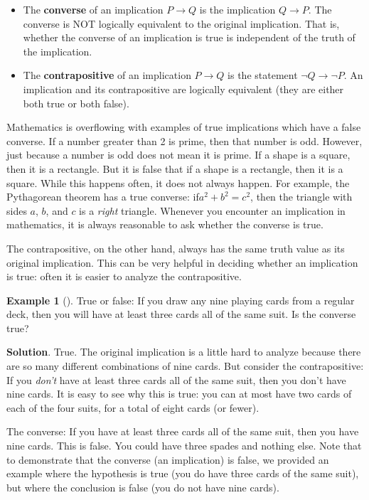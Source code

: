 \documentclass[10pt,]{book}
\newcommand{\terminology}[1]{\textbf{#1}}
\theoremstyle{plain}
\theoremstyle{definition}
\theoremstyle{definition}
\newtheorem{example}[theorem]{Example}
\theoremstyle{definition}
\theoremstyle{definition}
\numberwithin{equation}{chapter}
\def\imp{\rightarrow}
\begin{document}
\begin{assemblage}\label{assemblage-19}
\hypertarget{p-1405}{}%
%
\begin{itemize}[label=\textbullet]
\item{}\hypertarget{p-1406}{}%
The \terminology{converse}  of an implication \(P \imp Q\) is the implication \(Q \imp P\). The converse is NOT logically equivalent to the original implication.  That is, whether the converse of an implication is true is independent of the truth of the implication.%
\item{}\hypertarget{p-1407}{}%
The \terminology{contrapositive}  of an implication \(P \imp Q\) is the statement \(\neg Q \imp \neg P\). An implication and its contrapositive are logically equivalent (they are either both true or both false).%
\end{itemize}
%
\end{assemblage}
\hypertarget{p-1408}{}%
Mathematics is overflowing with examples of true implications which have a false converse. If a number greater than 2 is prime, then that number is odd. However, just because a number is odd does not mean it is prime. If a shape is a square, then it is a rectangle. But it is false that if a shape is a rectangle, then it is a square. While this happens often, it does not always happen. For example, the Pythagorean theorem has a true converse: if\(a^2 + b^2 = c^2\), then the triangle with sides \(a\), \(b\), and \(c\) is a \emph{right} triangle. Whenever you encounter an implication in mathematics, it is always reasonable to ask whether the converse is true.%
\par
\hypertarget{p-1409}{}%
The contrapositive, on the other hand, always has the same truth value as its original implication. This can be very helpful in deciding whether an implication is true: often it is easier to analyze the contrapositive.%
\begin{example}[]\label{example-34}
\hypertarget{p-1410}{}%
True or false: If you draw any nine playing cards from a regular deck, then you will have at least three cards all of the same suit. Is the converse true?%
\par\smallskip%
\noindent\textbf{Solution}.\hypertarget{solution-121}{}\quad%
\hypertarget{p-1411}{}%
True. The original implication is a little hard to analyze because there are so many different combinations of nine cards. But consider the contrapositive: If you \emph{don't} have at least three cards all of the same suit, then you don't have nine cards. It is easy to see why this is true: you can at most have two cards of each of the four suits, for a total of eight cards (or fewer).%
\par
\hypertarget{p-1412}{}%
The converse: If you have at least three cards all of the same suit, then you have nine cards. This is false. You could have three spades and nothing else. Note that to demonstrate that the converse (an implication) is false, we provided an example where the hypothesis is true (you do have three cards of the same suit), but where the conclusion is false (you do not have nine cards).%
\end{example}
\end{document}
